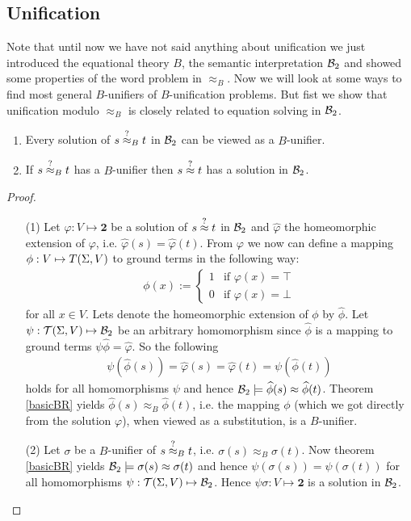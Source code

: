 		\subsection{Unification}
		Note that until now we have not said anything about unification we just introduced the equational theory $B$, the semantic interpretation ${\mathcal{B}_2}$ and showed some properties of the word problem in $\approx_B$. Now we will look at some ways to find most general $B$-unifiers of $B$-unification problems. But fist we show that unification modulo $\approx_B$ is closely related to equation solving in ${\mathcal{B}_2}$.
		\begin{lemma}\mbox{}
		\begin{enumerate}
		\item Every solution of $s\stackrel{?}{\approx}_B t$ in ${\mathcal{B}_2}$ can be viewed as a $B$-unifier.
		\item If $s\stackrel{?}{\approx}_B t$ has a $B$-unifier then $s\stackrel{?}{\approx} t$ has a solution in ${\mathcal{B}_2}$.
		\end{enumerate}
		\end{lemma}
		\begin{proof}\mbox{}
		\begin{itemize}
		\item[(1)]Let $\varphi:V\mapsto\textbf{2}$ be a solution of $s\stackrel{?}{\approx} t$ in ${\mathcal{B}_2}$ and $\widehat{\varphi}$ the homeomorphic extension of $\varphi$, i.e. $\widehat{\varphi}(s)=\widehat{\varphi}(t)$. From $\varphi$ we now can define a mapping $\phi:V\mapsto T(\Sigma,V)$ to ground terms in the following way:
		\begin{align*}
		\phi(x):=\begin{cases}
		1 & \text{if }\varphi(x)=\top\\
		0 & \text{if }\varphi(x)=\bot
		\end{cases}
		\end{align*}
		for all $x\in V$. Lets denote the homeomorphic extension of $\phi$ by $\widehat{\phi}$. Let $\psi:\mathcal{T}(\Sigma,V)\mapsto{\mathcal{B}_2}$ be an arbitrary homomorphism since $\widehat{\phi}$ is a mapping to ground terms $\psi\widehat{\phi}=\widehat{\varphi}$. So the following
		\begin{align*}
		\psi\left( \widehat{\phi}(s)\right)=\widehat{\varphi}(s)=\widehat{\varphi}(t)=\psi\left( \widehat{\phi}(t)\right) 
		\end{align*}
		holds for all homomorphisms $\psi$ and hence ${\mathcal{B}_2}\models\widehat{\phi}(s)\approx\widehat{\phi}(t)$. Theorem \ref{basicBR} yields $\widehat{\phi}(s)\approx_B\widehat{\phi}(t)$, i.e. the mapping $\phi$ (which we got directly from the solution $\varphi$), when viewed as a substitution, is a $B$-unifier.
		\item[(2)] Let $\sigma$ be a $B$-unifier of $s\stackrel{?}{\approx}_B t$, i.e. $\sigma(s)\approx_B\sigma(t)$. Now theorem \ref{basicBR} yields ${\mathcal{B}_2}\models\sigma(s)\approx\sigma(t)$ and hence $\psi\left(\sigma (s)\right)=\psi\left(\sigma (t)\right)$ for all homomorphisms $\psi:\mathcal{T}(\Sigma,V)\mapsto{\mathcal{B}_2}$. Hence $\psi\sigma:V\mapsto\textbf{2}$ is a solution in ${\mathcal{B}_2}$.
		\end{itemize}
		\end{proof}
